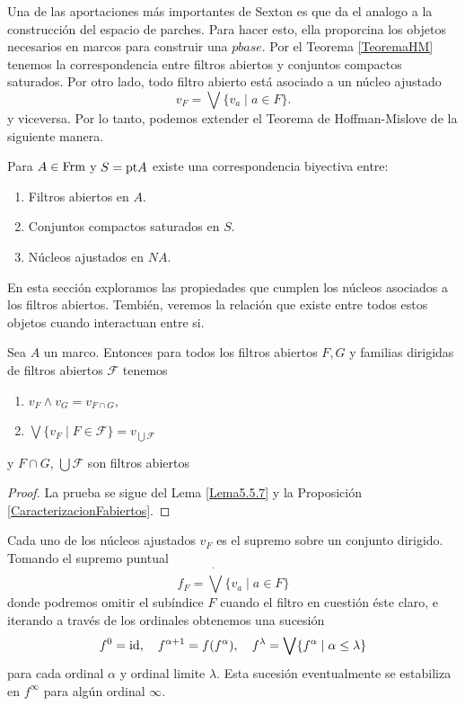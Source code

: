 Una de las aportaciones más importantes de Sexton es que da el analogo a la construcción del espacio de parches. Para hacer esto, 
ella proporcina los objetos necesarios en marcos para construir una $pbase$. Por el Teorema \ref{TeoremaHM} tenemos la correspondencia 
entre filtros abiertos y conjuntos compactos saturados. Por otro lado, todo filtro abierto está asociado a un núcleo ajustado  
\[
v_F=\bigvee\{v_a\mid a\in F\}.
\]
y viceversa. Por lo tanto, podemos extender el Teorema de Hoffman-Mislove de la siguiente manera.
\begin{thm}\label{HM extendido}
Para $A\in \mathrm{Frm}$ y $S=\mathrm{pt} A$ existe una correspondencia biyectiva entre: 
\begin{enumerate}[$i)$]
    \item Filtros abiertos en $A$.
    \item Conjuntos compactos saturados en $S$.
    \item Núcleos ajustados en $NA$.
\end{enumerate}
\end{thm}

En esta sección exploramos las propiedades que cumplen los núcleos asociados a los filtros abiertos. Tembién, veremos la relación que 
existe entre todos estos objetos cuando interactuan entre si.

\begin{lem}
    Sea $A$ un marco. Entonces para todos los filtros abiertos $F, G$ y familias dirigidas de filtros abiertos $\mathcal{F}$ tenemos
    \begin{enumerate}[$i)$]
        \item $v_F\wedge v_G=v_{F\cap G}$,
        \item $\bigvee\{v_F\mid F\in \mathcal{F}\}=v_{\bigcup \mathcal{F}}$
    \end{enumerate}
    y $F\cap G$, $\bigcup \mathcal{F}$ son filtros abiertos
\end{lem}

\begin{proof}
    La prueba se sigue del Lema \ref{Lema5.5.7} y la Proposición \ref{CaracterizacionFabiertos}.
\end{proof}

Cada uno de los núcleos ajustados $v_F$ es el supremo sobre un conjunto dirigido. Tomando el supremo puntual
\[
f_F=\dot{\bigvee}\{v_a\mid a\in F\}
\]
donde podremos omitir el subíndice $F$ cuando el filtro en cuestión éste claro, e iterando a través de los ordinales obtenemos una sucesión 
\[
f^0=\mathrm{id},\quad f^{\alpha+1}=f(f^\alpha), \quad f^\lambda=\bigvee\{f^\alpha\mid \alpha \leq \lambda\}
\]
para cada ordinal $\alpha$ y ordinal limite $\lambda$. Esta sucesión eventualmente se estabiliza en $f^\infty$ para algún ordinal $\infty$.\\

